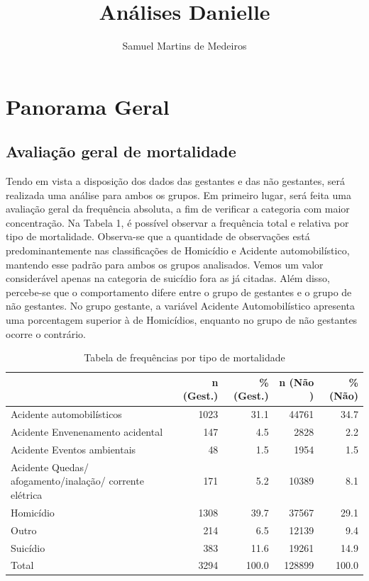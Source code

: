 \documentclass[
]{article}
\title{Análises Danielle}
\author{Samuel Martins de Medeiros}
\date{}
\begin{document}
\maketitle

\hypertarget{panorama-geral}{%
\section{Panorama Geral}\label{panorama-geral}}

\hypertarget{avaliauxe7uxe3o-geral-de-mortalidade}{%
\subsection{Avaliação geral de
mortalidade}\label{avaliauxe7uxe3o-geral-de-mortalidade}}

Tendo em vista a disposição dos dados das gestantes e das não gestantes,
será realizada uma análise para ambos os grupos. Em primeiro lugar, será
feita uma avaliação geral da frequência absoluta, a fim de verificar a
categoria com maior concentração. Na Tabela 1, é possível observar a
frequência total e relativa por tipo de mortalidade. Observa-se que a
quantidade de observações está predominantemente nas classificações de
Homicídio e Acidente automobilístico, mantendo esse padrão para ambos os
grupos analisados. Vemos um valor considerável apenas na categoria de
suicídio fora as já citadas. Além disso, percebe-se que o comportamento
difere entre o grupo de gestantes e o grupo de não gestantes. No grupo
gestante, a variável Acidente Automobilístico apresenta uma porcentagem
superior à de Homicídios, enquanto no grupo de não gestantes ocorre o
contrário.

\begin{table}

\caption{\label{tab:unnamed-chunk-1}Tabela de frequências por tipo de mortalidade}
\centering
\begin{tabular}[t]{l|r|r|r|r}
\hline
  & n (Gest.) & \% (Gest.) & n (Não
                 ) & \% (Não)\\
\hline
Acidente automobilísticos & 1023 & 31.1 & 44761 & 34.7\\
\hline
Acidente Envenenamento acidental & 147 & 4.5 & 2828 & 2.2\\
\hline
Acidente Eventos ambientais & 48 & 1.5 & 1954 & 1.5\\
\hline
Acidente Quedas/ afogamento/inalação/ corrente elétrica & 171 & 5.2 & 10389 & 8.1\\
\hline
Homicídio & 1308 & 39.7 & 37567 & 29.1\\
\hline
Outro & 214 & 6.5 & 12139 & 9.4\\
\hline
Suicídio & 383 & 11.6 & 19261 & 14.9\\
\hline
Total & 3294 & 100.0 & 128899 & 100.0\\
\hline
\end{tabular}
\end{table}
\end{document}
